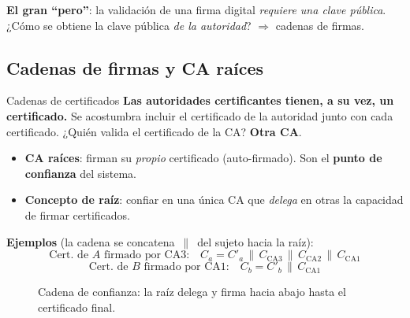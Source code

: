 \documentclass[11pt,a4paper]{article}
\newcommand{\concat}{\,\|\,}
\begin{document}
\begin{slidebox}
\textbf{El gran ``pero''}: la validación de una firma digital \emph{requiere una clave
pública}. ¿Cómo se obtiene la clave pública \emph{de la autoridad}? $\Rightarrow$ cadenas de
firmas.
\end{slidebox}

\subsection{Cadenas de firmas y CA raíces}

\begin{defbox}{Cadenas de certificados}
\textbf{Las autoridades certificantes tienen, a su vez, un certificado.} Se acostumbra incluir
el certificado de la autoridad junto con cada certificado. ¿Quién valida el certificado de la
CA? \textbf{Otra CA}.
\begin{itemize}[leftmargin=1.4em,itemsep=1pt]
  \item \textbf{CA raíces}: firman su \emph{propio} certificado (auto-firmado). Son el
        \textbf{punto de confianza} del sistema.
  \item \textbf{Concepto de raíz}: confiar en una única CA que \emph{delega} en otras la
        capacidad de firmar certificados.
\end{itemize}
\textbf{Ejemplos} (la cadena se concatena $\concat$ del sujeto hacia la raíz):
\[
  \text{Cert. de }A\text{ firmado por CA3:}\quad C_a = C'_a \concat C_{\text{CA3}} \concat C_{\text{CA2}} \concat C_{\text{CA1}}
\]
\[
  \text{Cert. de }B\text{ firmado por CA1:}\quad C_b = C'_b \concat C_{\text{CA1}}
\]
\end{defbox}

\begin{figure}[h]
\centering
{}
\caption{Cadena de confianza: la raíz delega y firma hacia abajo hasta el certificado final.}
\end{figure}
\end{document}
